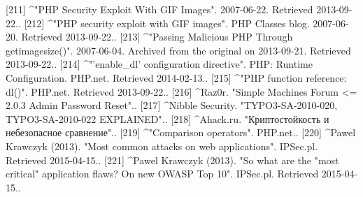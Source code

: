 [211]
^"PHP Security Exploit With GIF Images". 2007-06-22. Retrieved 2013-09-22..
[212]
^"PHP security exploit with GIF images". PHP Classes blog. 2007-06-20. Retrieved 2013-09-22..
[213]
^"Passing Malicious PHP Through getimagesize()". 2007-06-04. Archived from the original on 2013-09-21. Retrieved 2013-09-22..
[214]
^"'enable_dl' configuration directive". PHP: Runtime Configuration. PHP.net. Retrieved 2014-02-13..
[215]
^"PHP function reference: dl()". PHP.net. Retrieved 2013-09-22..
[216]
^Raz0r. "Simple Machines Forum <= 2.0.3 Admin Password Reset"..
[217]
^Nibble Security. "TYPO3-SA-2010-020, TYPO3-SA-2010-022 EXPLAINED"..
[218]
^Ahack.ru. "Криптостойкость и небезопасное сравнение"..
[219]
^"Comparison operators". PHP.net..
[220]
^Pawel Krawczyk (2013). "Most common attacks on web applications". IPSec.pl. Retrieved 2015-04-15..
[221]
^Pawel Krawczyk (2013). "So what are the "most critical" application flaws? On new OWASP Top 10". IPSec.pl. Retrieved 2015-04-15..